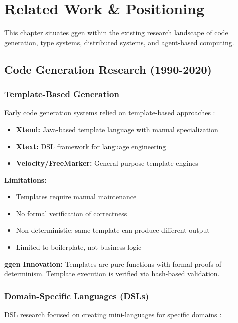 \chapter{Related Work \& Positioning}

This chapter situates ggen within the existing research landscape of code generation, type systems, distributed systems, and agent-based computing.

\section{Code Generation Research (1990-2020)}

\subsection{Template-Based Generation}

Early code generation systems relied on template-based approaches \cite{czarnecki2000feature}:

\begin{itemize}
    \item \textbf{Xtend:} Java-based template language with manual specialization
    \item \textbf{Xtext:} DSL framework for language engineering
    \item \textbf{Velocity/FreeMarker:} General-purpose template engines
\end{itemize}

\textbf{Limitations:}
\begin{itemize}
    \item Templates require manual maintenance
    \item No formal verification of correctness
    \item Non-deterministic: same template can produce different output
    \item Limited to boilerplate, not business logic
\end{itemize}

\textbf{ggen Innovation:} Templates are pure functions with formal proofs of determinism. Template execution is verified via hash-based validation.

\subsection{Domain-Specific Languages (DSLs)}

DSL research focused on creating mini-languages for specific domains \cite{mernik2005dsl}:

